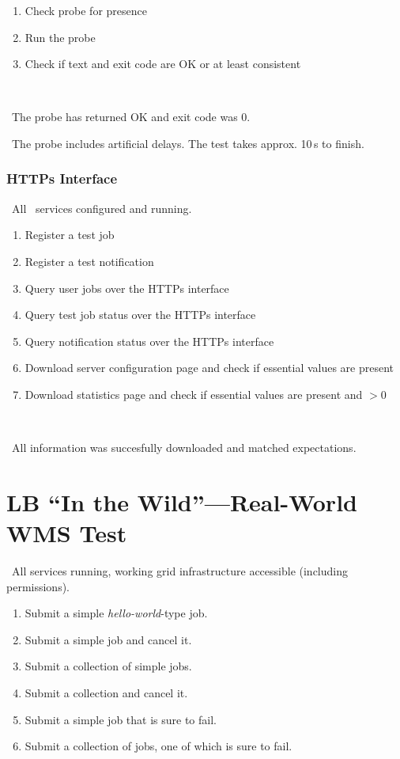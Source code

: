 \what
\begin{enumerate}
\item Check probe for presence
\item Run the probe
\item Check if text and exit code are OK or at least consistent
\end{enumerate}

\how\ 

\result\ The probe has returned OK and exit code was 0.

\note\ The probe includes artificial delays. The test takes approx. 10\,s to finish.

\subsubsection{HTTPs Interface}
\label{permissions}
\req\ All \LB\ services configured and running.

\what
\begin{enumerate}
\item Register a test job
\item Register a test notification
\item Query user jobs over the HTTPs interface
\item Query test job status over the HTTPs interface
\item Query notification status over the HTTPs interface
\item Download server configuration page and check if essential values are present
\item Download statistics page and check if essential values are present and $> 0$
\end{enumerate}

\how\ 

\result\ All information was succesfully downloaded and matched expectations.


\section{LB ``In the Wild''---Real-World WMS Test}
\req\ All \LB services running, working grid infrastructure accessible (including permissions). 

\what
\begin{enumerate}
\item Submit a simple \emph{hello-world}-type job.
\item Submit a simple job and cancel it.
\item Submit a collection of simple jobs.
\item Submit a collection and cancel it. 
\item Submit a simple job that is sure to fail.
\item Submit a collection of jobs, one of which is sure to fail. 
\end{enumerate}

